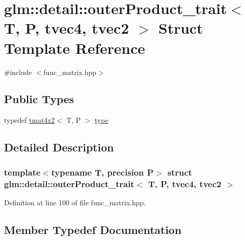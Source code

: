 \hypertarget{structglm_1_1detail_1_1outer_product__trait_3_01_t_00_01_p_00_01tvec4_00_01tvec2_01_4}{}\section{glm\+:\+:detail\+:\+:outer\+Product\+\_\+trait$<$ T, P, tvec4, tvec2 $>$ Struct Template Reference}
\label{structglm_1_1detail_1_1outer_product__trait_3_01_t_00_01_p_00_01tvec4_00_01tvec2_01_4}


{\ttfamily \#include $<$func\+\_\+matrix.\+hpp$>$}

\subsection*{Public Types}
\begin{DoxyCompactItemize}
\item 
typedef \hyperlink{structglm_1_1detail_1_1tmat4x2}{tmat4x2}$<$ T, P $>$ \hyperlink{structglm_1_1detail_1_1outer_product__trait_3_01_t_00_01_p_00_01tvec4_00_01tvec2_01_4_a15cc3a28bd3e09c75a19ce0349c76d9a}{type}
\end{DoxyCompactItemize}


\subsection{Detailed Description}
\subsubsection*{template$<$typename T, precision P$>$\newline
struct glm\+::detail\+::outer\+Product\+\_\+trait$<$ T, P, tvec4, tvec2 $>$}



Definition at line 100 of file func\+\_\+matrix.\+hpp.



\subsection{Member Typedef Documentation}
\mbox{\label{structglm_1_1detail_1_1outer_product__trait_3_01_t_00_01_p_00_01tvec4_00_01tvec2_01_4_a15cc3a28bd3e09c75a19ce0349c76d9a}} 
